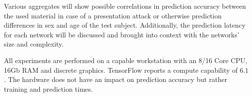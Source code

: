 Various aggregates will show possible correlations in prediction accuracy between the used material in case of a presentation attack or otherwise prediction differences in sex and age of the test subject.
Additionally, the prediction latency for each network will be discussed and brought into context with the networks' size and complexity.


All experiments are performed on a capable workstation with an 8/16 Core CPU, 16Gb RAM and discrete graphics.
TensorFlow reports a compute capability of $6.1$.
The hardware does not have an impact on prediction accuracy but rather training and prediction times.
